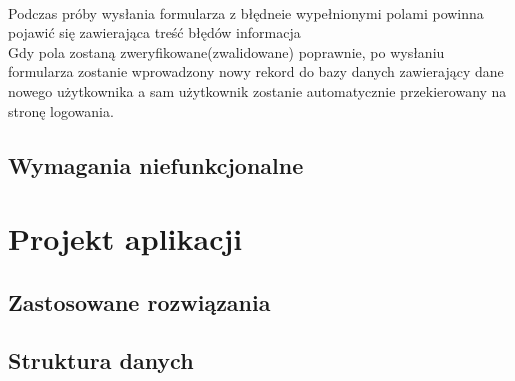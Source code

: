 \documentclass[eng,printmode]{mgr}
\begin{document}
\ \\
Podczas próby wysłania formularza z błędneie wypełnionymi polami powinna pojawić się zawierająca treść błędów informacja
\\
Gdy pola zostaną zweryfikowane(zwalidowane) poprawnie, po wysłaniu formularza zostanie wprowadzony nowy rekord do bazy danych zawierający dane nowego użytkownika a sam użytkownik zostanie automatycznie przekierowany na stronę logowania.
\section{Wymagania niefunkcjonalne}
\chapter{Projekt aplikacji}
\section{Zastosowane rozwiązania}
\section{Struktura danych}

\end{document}

